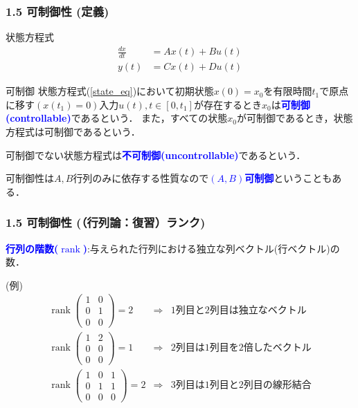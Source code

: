 \documentclass[10pt]{beamer}
\begin{document}
\begin{frame}[t]
\frametitle{1.5 可制御性 (定義)}
状態方程式
\begin{align}
 \frac{dx}{dt} &= A x(t) + B u(t)  \\
 y(t) &= C x(t) + D u(t) 
\end{align}

\begin{block}{可制御}
状態方程式(\ref{state_eq})において初期状態$x(0)=x_0$を有限時間$t_1$で原点に移す$(x(t_1)=0)$入力$u(t), t\in[0,t_1]$が存在するとき$x_0$は\textcolor{blue}{\bf 可制御(controllable)}であるという．
また，すべての状態$x_0$が可制御であるとき，状態方程式は可制御であるという．
\end{block}

可制御でない状態方程式は\textcolor{blue}{\bf 不可制御(uncontrollable)}であるという．

可制御性は$A,B$行列のみに依存する性質なので\textcolor{blue}{\bf $(A,B)$可制御}ということもある．
\end{frame}



\begin{frame}[t]
\frametitle{1.5 可制御性 (（行列論：復習）ランク)}
\textcolor{blue}{\bf 行列の階数($\operatorname{rank}$)}:与えられた行列における独立な列ベクトル(行ベクトル)の数．

(例)
\[
 \begin{array}{lcl}
  \operatorname{rank}
   \left(
    \begin{array}{cc}
     1 & 0 \\
     0 & 1 \\
     0 & 0
    \end{array}
   \right) = 2 & \Rightarrow & \mbox{1列目と2列目は独立なベクトル} \\
  \operatorname{rank}
   \left(
    \begin{array}{cc}
     1 & 2 \\
     0 & 0 \\
     0 & 0
    \end{array}
   \right) = 1 & \Rightarrow & \mbox{2列目は1列目を2倍したベクトル} \\
  \operatorname{rank}
   \left(
    \begin{array}{ccc}
     1 & 0 & 1 \\
     0 & 1 & 1\\
     0 & 0 & 0
    \end{array}
   \right) = 2 & \Rightarrow & \mbox{3列目は1列目と2列目の線形結合}
 \end{array}
\]
\end{frame}
\end{document}
